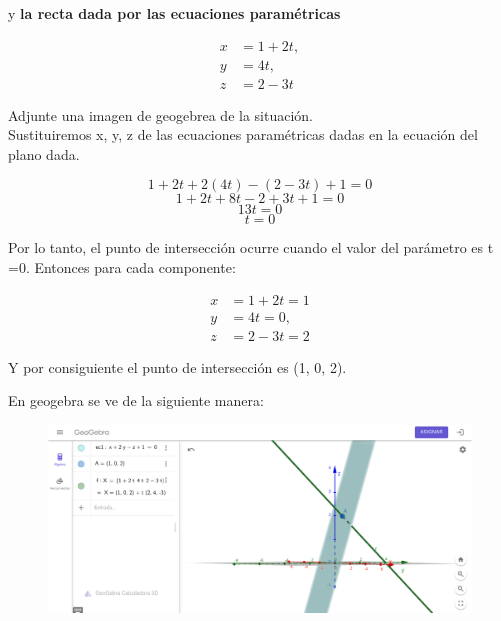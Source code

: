 \documentclass[12pt]{article}
\begin{document}
y \textbf{la recta dada por las ecuaciones paramétricas}

\begin{align*}
  x &= 1 + 2t,\\
  y &=4t,\\
  z &= 2 - 3t
\end{align*}

Adjunte una imagen de geogebrea de la situación. \\

Sustituiremos x, y, z de las ecuaciones paramétricas dadas en la ecuación del plano dada.

\[ 1 + 2t + 2(4t) - (2-3t)+1 =0 \]
\[ 1 + 2t + 8t - 2+3t +1 =0 \]
\[  13t =0 \]
\[ t = 0\]

Por lo tanto, el punto de intersección ocurre cuando el valor del parámetro es t =0.
Entonces para cada componente:

\begin{align*}
  x &= 1 + 2t = 1\\
  y &=4t = 0,\\
  z &= 2 - 3t = 2 
\end{align*}

Y por consiguiente el punto de intersección es (1, 0, 2).

En geogebra se ve de la siguiente manera:

\begin{figure}[H]
  \centering
  \includegraphics[width=1\textwidth]{./img/interPlano.png}
\end{figure}
\end{document}
